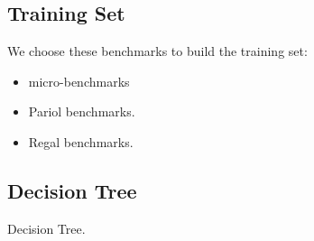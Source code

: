 \subsection{Training Set}


We choose these benchmarks to build the training set:

\begin{itemize}

\item micro-benchmarks

\item Pariol benchmarks.

\item Regal benchmarks.

\end{itemize}

\subsection{Decision Tree}
\label{subsec:decisiontree}

Decision Tree.

